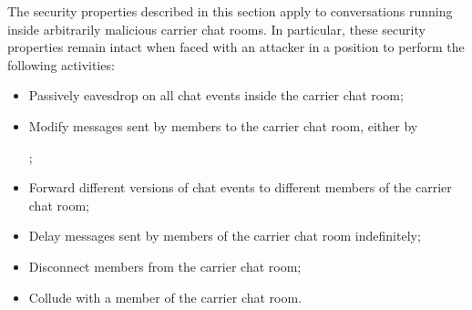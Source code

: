 \documentclass{article}
\begin{document}
The security properties described in this section apply to conversations running inside arbitrarily malicious carrier chat rooms.
In particular, these security properties remain intact when faced with an attacker in a position to perform the following activities:
\begin{itemize}
\item Passively eavesdrop on all chat events inside the carrier chat room;
\item Modify messages sent by members to the carrier chat room, either by ;
\item Forward different versions of chat events to different members of the carrier chat room;
\item Delay messages sent by members of the carrier chat room indefinitely;
\item Disconnect members from the carrier chat room;
\item Collude with a member of the carrier chat room.
\end{itemize}
\end{document}
